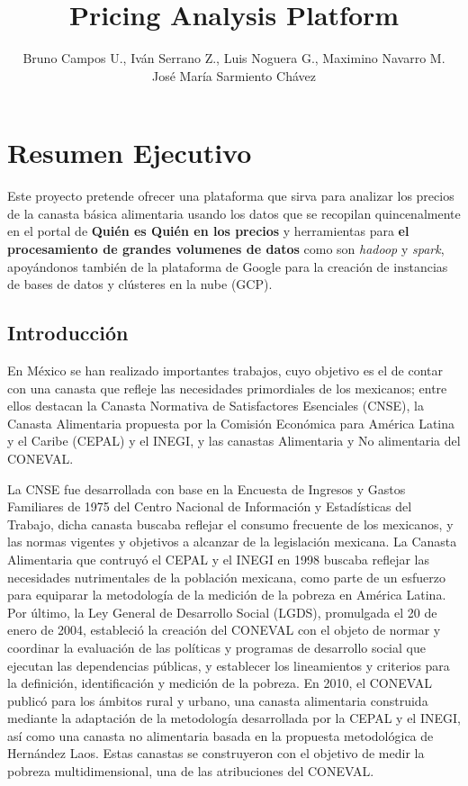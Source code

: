 \documentclass{article}
\title{\textbf{Pricing Analysis Platform}}
\author{Bruno Campos U., Iván Serrano Z., Luis Noguera G., Maximino Navarro M. 
\\ José María Sarmiento Chávez}
\affil[]{Universidad Panamericana 
\\Maestría en Ciencia de Datos}
\begin{document}
\maketitle

\section{Resumen Ejecutivo}
Este proyecto pretende ofrecer una plataforma que sirva para analizar los precios de la canasta básica alimentaria usando los datos que se recopilan quincenalmente en el portal de \textbf{Quién es Quién en los precios} y herramientas para \textbf{el procesamiento de grandes volumenes de datos} como son \textit{hadoop} y \textit{spark}, apoyándonos también de la plataforma de Google para la creación de instancias de bases de datos y clústeres en la nube (GCP).

\subsection{Introducción}

En México se han realizado importantes trabajos, cuyo objetivo es el de contar con una canasta que refleje las necesidades primordiales de los mexicanos; entre ellos destacan la Canasta Normativa de Satisfactores Esenciales (CNSE), la Canasta Alimentaria propuesta por la Comisión Económica para América Latina y el Caribe (CEPAL) y el INEGI, y las canastas Alimentaria y No alimentaria del CONEVAL.

La CNSE fue desarrollada con base en la Encuesta de Ingresos y Gastos Familiares de 1975 del Centro Nacional de Información y Estadísticas del Trabajo, dicha canasta buscaba reflejar el consumo frecuente de los mexicanos, y las normas vigentes y objetivos a alcanzar de la legislación mexicana. La Canasta Alimentaria que contruyó el CEPAL y el INEGI en 1998 buscaba reflejar las necesidades nutrimentales de la población mexicana, como parte de un esfuerzo para equiparar la metodología de la medición de la pobreza en América Latina. Por último, la Ley General de Desarrollo Social (LGDS), promulgada el 20 de enero de 2004, estableció la creación del CONEVAL con el objeto de normar y coordinar la evaluación de las políticas y programas de desarrollo social que ejecutan las dependencias públicas, y establecer los lineamientos y criterios para la definición, identificación y medición de la pobreza. En 2010, el CONEVAL publicó para los ámbitos rural y urbano, una canasta alimentaria construida mediante la adaptación de la metodología desarrollada por la CEPAL y el INEGI, así como una canasta no alimentaria basada en la propuesta metodológica de Hernández Laos. Estas canastas se construyeron con el objetivo de medir la pobreza multidimensional, una de las atribuciones del CONEVAL.
\end{document}
